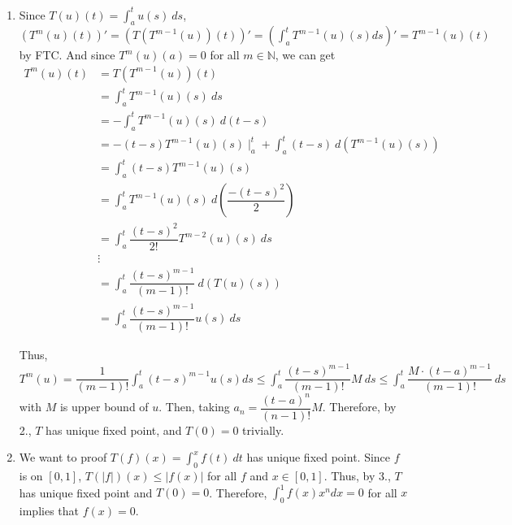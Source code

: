\documentclass[12pt]{article}
\begin{document}
\begin{enumerate}
    \item Since $T(u)(t) = \displaystyle\int_a^t u(s)\ ds$, 
    $\left( T^m(u)(t)\right)' = \left( T(T^{m-1}(u))(t)\right)' = \left( \displaystyle\int_{a}^{t} T^{m-1}(u)(s) ds\right)' = T^{m-1}(u)(t)$ by FTC.
    And since $T^m(u)(a) = 0$ for all $m\in \mathbb{N}$,
    we can get \begin{align*}
        T^{m}(u)(t) &= T(T^{m-1}(u))(t)\\
        &= \int_{a}^{t} T^{m-1}(u)(s)\ ds\\
        &= -\int_{a}^{t} T^{m-1}(u)(s)\ d(t-s)\\
        &= - (t-s) T^{m-1}(u)(s)\mid_a^t + \int_{a}^{t} (t-s)\ d(T^{m-1}(u)(s))\\
        &= \int_{a}^{t} (t-s)T^{m-1}(u)(s)\\
        &= \int_{a}^{t} T^{m-1}(u)(s)\ d(\dfrac{-(t-s)^2}{2})\\
        &= \int_{a}^{t} \dfrac{(t-s)^2}{2!} T^{m-2}(u)(s)\ ds\\
        &\vdots\\
        &= \int_{a}^{t} \dfrac{(t-s)^{m-1}}{(m-1)!} \ d(T(u)(s))\\
        &= \int_{a}^{t} \dfrac{(t-s)^{m-1}}{(m-1)!} u(s)\ ds
    \end{align*}

    Thus, $T^m(u) = \dfrac{1}{(m-1)!}\displaystyle\int_{a}^{t} (t-s)^{m-1} u(s) ds \leq \displaystyle\int_{a}^{t} \dfrac{(t-s)^{m-1}}{(m-1)!} M\ ds \leq \displaystyle\int_{a}^{t} \dfrac{M\cdot (t-a)^{m-1}}{(m-1)!}\ ds$
    with $M$ is upper bound of $u$. Then, taking $a_n = \dfrac{(t-a)^n}{(n-1)!}M$.
    Therefore, by 2., $T$ has unique fixed point, and $T(0) = 0$ trivially.

    \item We want to proof $T(f)(x) = \displaystyle\int_0^x f(t)\ dt$ has unique fixed point.
    Since $f$ is on $[0, 1]$, $T(|f|)(x) \leq |f(x)|$ for all $f$ and $x\in [0, 1]$.
    Thus, by 3., $T$ has unique fixed point and $T(0) = 0$. 
    Therefore, $\displaystyle\int_{0}^{1} f(x) x^n dx = 0$ for all $x$ implies that $f(x) = 0$.
\end{enumerate}
\end{document}
